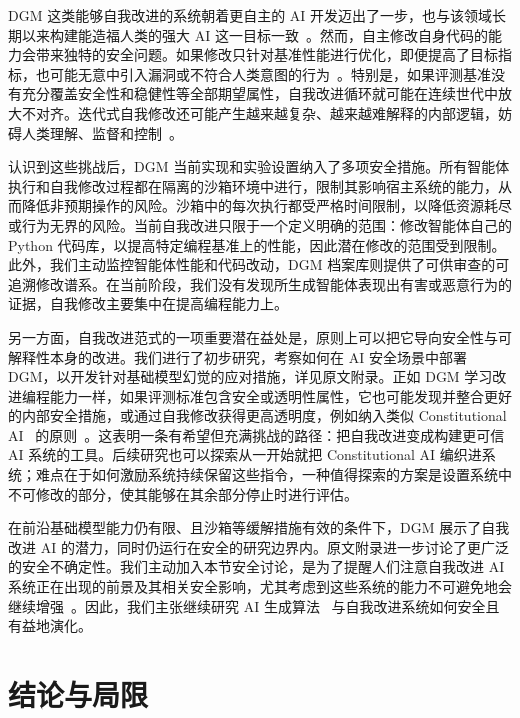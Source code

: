 \documentclass[10pt,twocolumn]{article}
\begin{document}
DGM 这类能够自我改进的系统朝着更自主的 AI 开发迈出了一步，也与该领域长期以来构建能造福人类的强大 AI 这一目标一致~\citep{schmidhuber1987evolutionary,clune2019ai,markoff2016machines,lehman2023machine}。然而，自主修改自身代码的能力会带来独特的安全问题。如果修改只针对基准性能进行优化，即便提高了目标指标，也可能无意中引入漏洞或不符合人类意图的行为~\citep{bostrom2020ethical}。特别是，如果评测基准没有充分覆盖安全性和稳健性等全部期望属性，自我改进循环就可能在连续世代中放大不对齐。迭代式自我修改还可能产生越来越复杂、越来越难解释的内部逻辑，妨碍人类理解、监督和控制~\citep{sheth2025safety,anwar2024foundational,greenblatt2024alignment,ganguli2022red}。

认识到这些挑战后，DGM 当前实现和实验设置纳入了多项安全措施。所有智能体执行和自我修改过程都在隔离的沙箱环境中进行，限制其影响宿主系统的能力，从而降低非预期操作的风险。沙箱中的每次执行都受严格时间限制，以降低资源耗尽或行为无界的风险。当前自我改进只限于一个定义明确的范围：修改智能体自己的 Python 代码库，以提高特定编程基准上的性能，因此潜在修改的范围受到限制。此外，我们主动监控智能体性能和代码改动，DGM 档案库则提供了可供审查的可追溯修改谱系。在当前阶段，我们没有发现所生成智能体表现出有害或恶意行为的证据，自我修改主要集中在提高编程能力上。

另一方面，自我改进范式的一项重要潜在益处是，原则上可以把它导向安全性与可解释性本身的改进。我们进行了初步研究，考察如何在 AI 安全场景中部署 DGM，以开发针对基础模型幻觉的应对措施，详见原文附录。正如 DGM 学习改进编程能力一样，如果评测标准包含安全或透明性属性，它也可能发现并整合更好的内部安全措施，或通过自我修改获得更高透明度，例如纳入类似 Constitutional AI~\citep{bai2022constitutional} 的原则~\citep{rosser2025agentbreeder}。这表明一条有希望但充满挑战的路径：把自我改进变成构建更可信 AI 系统的工具。后续研究也可以探索从一开始就把 Constitutional AI 编织进系统；难点在于如何激励系统持续保留这些指令，一种值得探索的方案是设置系统中不可修改的部分，使其能够在其余部分停止时进行评估。

在前沿基础模型能力仍有限、且沙箱等缓解措施有效的条件下，DGM 展示了自我改进 AI 的潜力，同时仍运行在安全的研究边界内。原文附录进一步讨论了更广泛的安全不确定性。我们主动加入本节安全讨论，是为了提醒人们注意自我改进 AI 系统正在出现的前景及其相关安全影响，尤其考虑到这些系统的能力不可避免地会继续增强~\citep{yudkowsky2008artificial,bostrom2002a,ecoffet2020open,bengio2024managing,clune2019ai}。因此，我们主张继续研究 AI 生成算法~\citep{clune2019ai} 与自我改进系统如何安全且有益地演化。

\section{结论与局限}
\label{sec:conclusion}
\end{document}

